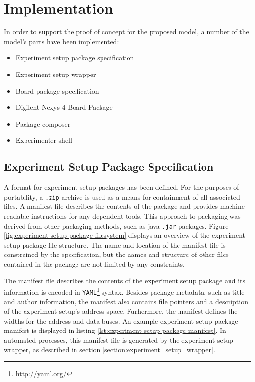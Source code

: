 \documentclass[main.tex]{subfiles}
\begin{document}
\chapter{Implementation}
In order to support the proof of concept for the proposed model, a number of the model's parts have been implemented:
\begin{itemize}
    \item Experiment setup package specification
    \item Experiment setup wrapper
    \item Board package specification
    \item Digilent Nexys 4 Board Package
    \item Package composer
    \item Experimenter shell
\end{itemize}


\section{Experiment Setup Package Specification}
\label{section:experiment-setup-package-specification}
A format for experiment setup packages has been defined. For the purposes of portability, a \texttt{.zip} archive is used as a means for containment of all associated files. A manifest file describes the contents of the package and provides machine-readable instructions for any dependent tools. This approach to packaging was derived from other packaging methods, such as java \texttt{.jar} packages. Figure \ref{fig:experiment-setup-package-filesystem} displays an overview of the experiment setup package file structure. The name and location of the manifest file is constrained by the specification, but the names and structure of other files contained in the package are not limited by any constraints.

\begin{figure}[h]
\centering
\caption{An overview of the experiment setup package file structure}
\label{fig:experiment-setup-package-filesystem}
\begin{subfigure}[b]{0.4\textwidth}
\end{subfigure}
\end{figure}

The manifest file describes the contents of the experiment setup package and its information is encoded in \texttt{YAML}\footnote{http://yaml.org/} syntax. Besides package metadata, such as title and author information, the manifest also contains file pointers and a description of the experiment setup's address space. Furhermore, the manifest defines the widths for the address and data buses. An example experiment setup package manifest is displayed in listing \ref{lst:experiment-setup-package-manifest}. In automated processes, this manifest file is generated by the experiment setup wrapper, as described in section \ref{section:experiment_setup_wrapper}.
\end{document}
